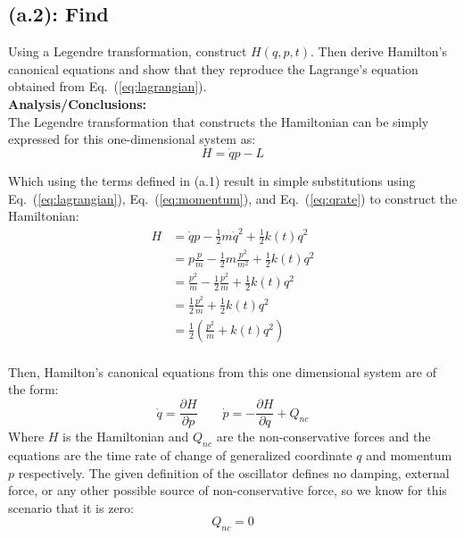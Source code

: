 \documentclass[titlepage]{article}
\begin{document}
\subsection*{(a.2): Find}

Using a Legendre transformation, construct $H(q,p,t)$. Then derive Hamilton's canonical equations and show that they reproduce the Lagrange's equation obtained from Eq.~(\ref{eq:lagrangian}). \\

\textbf{Analysis/Conclusions:}\\

The Legendre transformation that constructs the Hamiltonian can be simply expressed for this one-dimensional system as:
\begin{equation}
	H=\dot{q}p-L
\end{equation}

Which using the terms defined in (a.1) result in simple substitutions using Eq.~(\ref{eq:lagrangian}), Eq.~(\ref{eq:momentum}), and Eq.~(\ref{eq:qrate}) to construct the Hamiltonian:
\begin{equation}
	\begin{split}
		H&=\dot{q}p-\frac{1}{2}m\dot{q}^2+\frac{1}{2}k(t)q^2 \\
		&=p\frac{p}{m}-\frac{1}{2}m\frac{p^2}{m^2}+\frac{1}{2}k(t)q^2 \\
		&=\frac{p^2}{m}-\frac{1}{2}\frac{p^2}{m}+\frac{1}{2}k(t)q^2 \\
		&=\frac{1}{2}\frac{p^2}{m}+\frac{1}{2}k(t)q^2 \\
		&=\frac{1}{2}\left(\frac{p^2}{m}+k(t)q^2\right) \\
	\end{split}
\end{equation}

Then, Hamilton's canonical equations from this one dimensional system are of the form:
\begin{equation}
	\dot{q}=\frac{\partial H}{\partial p}\qquad\dot{p}=-\frac{\partial H}{\partial q}+Q_{nc}
\end{equation}
Where $H$ is the Hamiltonian and $Q_{nc}$ are the non-conservative forces and the equations are the time rate of change of generalized coordinate $q$ and momentum $p$ respectively. The given definition of the oscillator defines no damping, external force, or any other possible source of non-conservative force, so we know for this scenario that it is zero:
\begin{equation}
	Q_{nc}=0
\end{equation}
\end{document}
